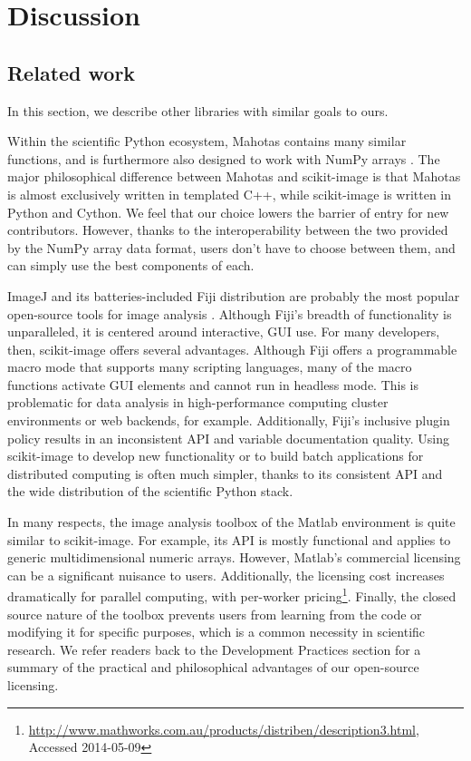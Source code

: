 
\section*{Discussion}
  \label{sec:discussion}

  \subsection*{Related work}

  In this section, we describe other libraries with similar goals to ours.
  
  Within the scientific Python ecosystem, Mahotas contains many similar
  functions, and is furthermore also designed to work with NumPy arrays
  \citep{Mahotas}. The major philosophical difference between Mahotas and
  scikit-image is that Mahotas is almost exclusively written in templated C++,
  while scikit-image is written in Python and Cython. We feel that our choice
  lowers the barrier of entry for new contributors. However,
  thanks to the interoperability between the two provided by the NumPy array
  data format, users don't have to choose between them, and can simply use the
  best components of each.

  ImageJ and its batteries-included Fiji distribution are probably the most
  popular open-source tools for image analysis \citep{imagej,Fiji}. Although 
  Fiji's breadth of functionality is unparalleled, it is centered around 
  interactive, GUI use. For many developers, then, scikit-image offers several
  advantages. Although Fiji offers a
  programmable macro mode that supports many scripting languages, many of the
  macro functions activate GUI elements and cannot run in headless mode. This
  is problematic for data analysis in high-performance computing
  cluster environments or web backends, for example. Additionally, Fiji's
  inclusive plugin policy results in an inconsistent API and variable
  documentation quality. Using scikit-image to develop new functionality or
  to build batch applications for distributed computing is often much simpler,
  thanks to its consistent API and the wide distribution of the scientific
  Python stack.

  In many respects, the image analysis toolbox of the Matlab environment is
  quite similar to scikit-image. For example, its API is mostly functional and
  applies to generic multidimensional numeric arrays. However, Matlab's
  commercial licensing can be a significant nuisance to users. Additionally,
  the licensing cost increases dramatically for parallel computing, with
  per-worker pricing\footnote{\url{http://www.mathworks.com.au/products/distriben/description3.html}, Accessed 2014-05-09}.
  Finally, the closed source nature of the toolbox prevents users from
  learning from the code or modifying it for specific purposes, which is a
  common necessity in scientific research. We refer readers back to the
  Development Practices section for a summary of the practical and
  philosophical advantages of our open-source licensing.


